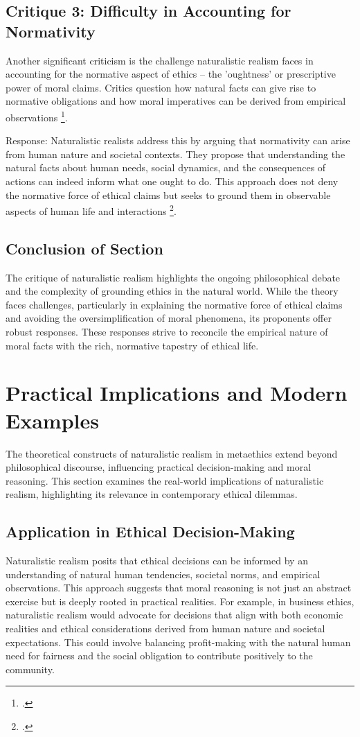 \documentclass[12pt,a4paper]{article}
\begin{document}
\subsection{Critique 3: Difficulty in Accounting for Normativity}
Another significant criticism is the challenge naturalistic realism faces in accounting for the normative aspect of ethics – the 'oughtness' or prescriptive power of moral claims. Critics question how natural facts can give rise to normative obligations and how moral imperatives can be derived from empirical observations \footcite{McPherson2012}.

Response: Naturalistic realists address this by arguing that normativity can arise from human nature and societal contexts. They propose that understanding the natural facts about human needs, social dynamics, and the consequences of actions can indeed inform what one ought to do. This approach does not deny the normative force of ethical claims but seeks to ground them in observable aspects of human life and interactions \footcite[339-362]{Stringer2018}.

\subsection{Conclusion of Section}
The critique of naturalistic realism highlights the ongoing philosophical debate and the complexity of grounding ethics in the natural world. While the theory faces challenges, particularly in explaining the normative force of ethical claims and avoiding the oversimplification of moral phenomena, its proponents offer robust responses. These responses strive to reconcile the empirical nature of moral facts with the rich, normative tapestry of ethical life.

\section{Practical Implications and Modern Examples}

The theoretical constructs of naturalistic realism in metaethics extend beyond philosophical discourse, influencing practical decision-making and moral reasoning. This section examines the real-world implications of naturalistic realism, highlighting its relevance in contemporary ethical dilemmas.

\subsection{Application in Ethical Decision-Making}
Naturalistic realism posits that ethical decisions can be informed by an understanding of natural human tendencies, societal norms, and empirical observations. This approach suggests that moral reasoning is not just an abstract exercise but is deeply rooted in practical realities. For example, in business ethics, naturalistic realism would advocate for decisions that align with both economic realities and ethical considerations derived from human nature and societal expectations. This could involve balancing profit-making with the natural human need for fairness and the social obligation to contribute positively to the community.
\end{document}
